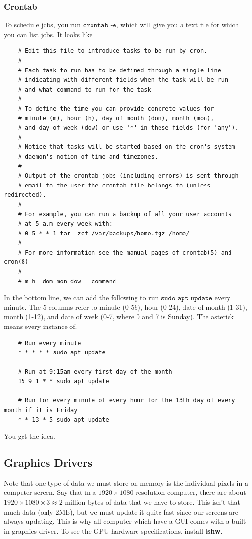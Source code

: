 \subsubsection{Crontab}

  To schedule jobs, you run $\texttt{crontab -e}$, which will give you a text file for which you can list jobs. It looks like  

  \begin{lstlisting}
    # Edit this file to introduce tasks to be run by cron.
    # 
    # Each task to run has to be defined through a single line
    # indicating with different fields when the task will be run
    # and what command to run for the task
    # 
    # To define the time you can provide concrete values for
    # minute (m), hour (h), day of month (dom), month (mon),
    # and day of week (dow) or use '*' in these fields (for 'any').
    # 
    # Notice that tasks will be started based on the cron's system
    # daemon's notion of time and timezones.
    # 
    # Output of the crontab jobs (including errors) is sent through
    # email to the user the crontab file belongs to (unless redirected).
    # 
    # For example, you can run a backup of all your user accounts
    # at 5 a.m every week with:
    # 0 5 * * 1 tar -zcf /var/backups/home.tgz /home/
    # 
    # For more information see the manual pages of crontab(5) and cron(8)
    # 
    # m h  dom mon dow   command
  \end{lstlisting}

  In the bottom line, we can add the following to run $\texttt{sudo apt update}$ every minute. The 5 columns refer to minute (0-59), hour (0-24), date of month (1-31), month (1-12), and date of week (0-7, where 0 and 7 is Sunday). The asterick means every instance of. 

  \begin{lstlisting}
    # Run every minute
    * * * * * sudo apt update 

    # Run at 9:15am every first day of the month 
    15 9 1 * * sudo apt update

    # Run for every minute of every hour for the 13th day of every month if it is Friday
    * * 13 * 5 sudo apt update
  \end{lstlisting}
  You get the idea. 

\subsection{Graphics Drivers}
  
  Note that one type of data we must store on memory is the individual pixels in a computer screen. Say that in a $1920 \times 1080$ resolution computer, there are about $1920 \times 1080 \times 3 \approx 2$ million bytes of data that we have to store. This isn't that much data (only 2MB), but we must update it quite fast since our screens are always updating. This is why all computer which have a GUI comes with a built-in graphics driver. To see the GPU hardware specifications, install \textbf{lshw}. 

